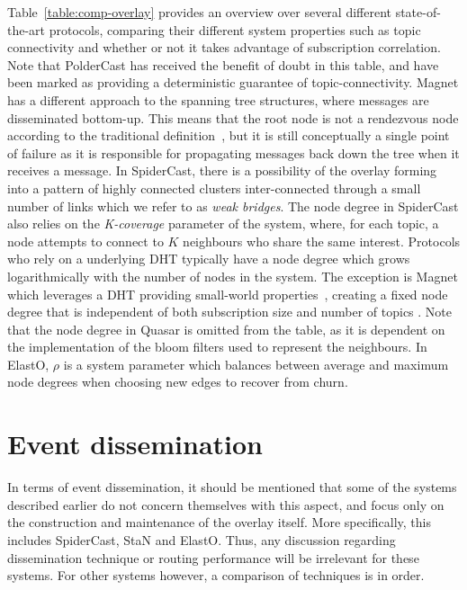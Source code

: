 

Table~\ref{table:comp-overlay} provides an overview over several
different state-of-the-art protocols, comparing their different system
properties such as topic connectivity and whether or not it takes
advantage of subscription correlation.  Note that
PolderCast has received the benefit of doubt in this table, and have
been marked as providing a deterministic guarantee of
topic-connectivity. Magnet has a different approach to the spanning tree
structures, where messages are disseminated bottom-up. This means that
the root node is not a rendezvous node according to  the traditional
definition~\cite{baldoni2005distributed}, but it is still conceptually
a single point of failure as it is responsible for propagating messages
back down the tree when it receives a message. In SpiderCast, there is a possibility
of the overlay forming into a pattern of highly connected clusters
inter-connected through a small number of links which we refer to as
\emph{weak bridges}. The node degree in SpiderCast also relies on the
\emph{K-coverage} parameter of the system, where, for each topic, a node
attempts to connect to $K$ neighbours who share the same interest.
Protocols who rely on a underlying DHT typically have a node degree
which grows logarithmically with the number of nodes in the system. The
exception is Magnet which leverages a DHT providing small-world
properties~\cite{girdzijauskas2007oscar}, creating a fixed node degree
that is independent of both subscription size and number of topics
\cite{Zhuang:2001}.  Note that the node degree in Quasar is omitted from
the table, as it is dependent on the implementation of the bloom filters
used to represent the neighbours. In ElastO, $\rho$ is a system parameter
which balances between average and maximum node degrees when choosing
new edges to recover from churn.


\section{Event dissemination}

In terms of event dissemination, it should be mentioned that some of
the systems described earlier do not concern themselves with this aspect, and
focus only on the construction and maintenance of the overlay
itself. More specifically, this includes SpiderCast, StaN and ElastO. Thus, any
discussion regarding dissemination technique or routing performance
will be irrelevant for these systems. For other systems however, a
comparison of techniques is in order.


